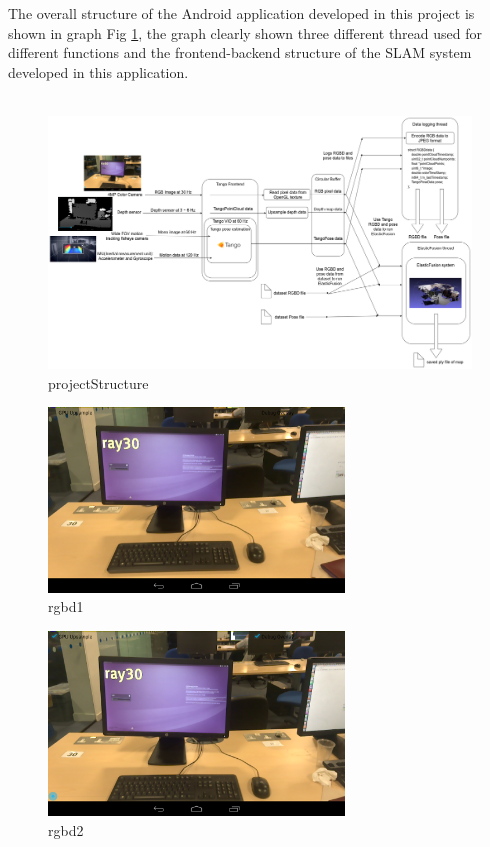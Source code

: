 \documentclass[12pt,twoside]{article}
\begin{document}
The overall structure of the Android application developed in this project is shown in graph Fig \ref{fig: projectStructure}, the graph clearly shown three different thread used for different functions and the frontend-backend structure of the SLAM system developed in this application.\\
\\
\begin{figure}[h]
    \centering
    \includegraphics[width=1.0\textwidth]{figures/projectStructure}
    \caption{projectStructure}
    \label{fig: projectStructure}
\end{figure}

\begin{figure}[h]
    \centering
    \includegraphics[width=0.7\textwidth]{figures/rgbd1}
    \caption{rgbd1}
    \label{fig: rgbd1}
\end{figure}

\begin{figure}[h]
    \centering
    \includegraphics[width=0.7\textwidth]{figures/rgbd2}
    \caption{rgbd2}
    \label{fig: rgbd2}
\end{figure}
\end{document}
